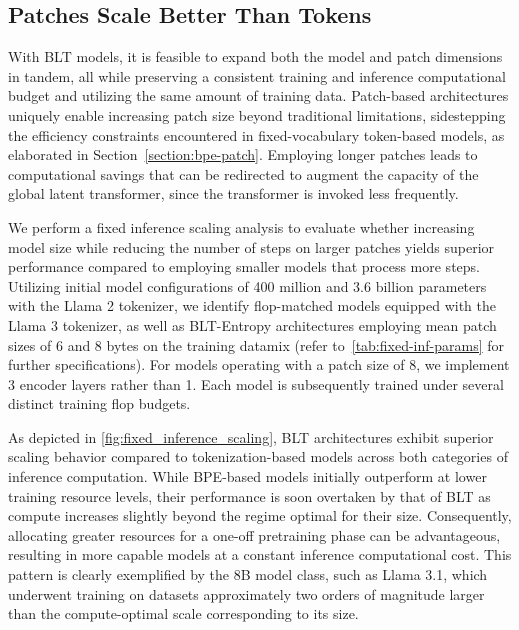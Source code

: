 \subsection{Patches Scale Better Than Tokens} With {\textsc BLT} models, it is feasible to expand both the model and patch dimensions in tandem, all while preserving a consistent training and inference computational budget and utilizing the same amount of training data. Patch-based architectures uniquely enable increasing patch size beyond traditional limitations, sidestepping the efficiency constraints encountered in fixed-vocabulary token-based models, as elaborated in Section~\ref{section:bpe-patch}. Employing longer patches leads to computational savings that can be redirected to augment the capacity of the global latent transformer, since the transformer is invoked less frequently.

We perform a fixed inference scaling analysis to evaluate whether increasing model size while reducing the number of steps on larger patches yields superior performance compared to employing smaller models that process more steps. Utilizing initial model configurations of 400 million and 3.6 billion parameters with the Llama 2 tokenizer, we identify flop-matched models equipped with the Llama 3 tokenizer, as well as {\textsc BLT}-Entropy architectures employing mean patch sizes of 6 and 8 bytes on the training datamix (refer to~\autoref{tab:fixed-inf-params} for further specifications). For models operating with a patch size of 8, we implement 3 encoder layers rather than 1. Each model is subsequently trained under several distinct training flop budgets.

As depicted in \autoref{fig:fixed_inference_scaling}, {\textsc BLT} architectures exhibit superior scaling behavior compared to tokenization-based models across both categories of inference computation. While BPE-based models initially outperform at lower training resource levels, their performance is soon overtaken by that of {\textsc BLT} as compute increases slightly beyond the regime optimal for their size. Consequently, allocating greater resources for a one-off pretraining phase can be advantageous, resulting in more capable models at a constant inference computational cost. This pattern is clearly exemplified by the 8B model class, such as Llama 3.1, which underwent training on datasets approximately two orders of magnitude larger than the compute-optimal scale corresponding to its size.

